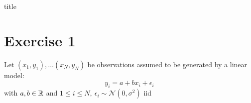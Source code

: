 \documentclass[12pt]{article}
\begin{document}
{title}

\restoregeometry
{}
\tableofcontents

\clearpage
{}

\section{Exercise 1}
Let \((x_1, y_1), \ldots (x_N, y_N)\) be observations assumed to be generated by a linear model:
\begin{equation}
    \label{eqn: linear model}
    \tag{LM}
    y_i = a + bx_i + \epsilon_i
\end{equation}
with \(a,b \in \mathbb{R}\) and \(1 \leq i \leq N, \ \epsilon_i \sim \mathcal{N}(0, \sigma^2)\) \gls{iid}
\end{document}
